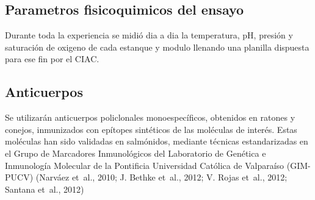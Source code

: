 \documentclass[12pt,letterpaper,oneside]{scrbook}
\begin{document}
\subsection{Parametros fisicoquimicos del ensayo}

Durante toda la experiencia se midió dia a dia la temperatura, pH,
presión y saturación de oxigeno de cada estanque y modulo llenando una
planilla dispuesta para ese fin por el CIAC.

\subsection{Anticuerpos}

Se utilizarán anticuerpos policlonales monoespecíficos, obtenidos en
ratones y conejos, inmunizados con epítopes sintéticos de las moléculas
de interés. Estas moléculas han sido validadas en salmónidos, mediante
técnicas estandarizadas en el Grupo de Marcadores Inmunológicos del
Laboratorio de Genética e Inmunología Molecular de la Pontificia
Universidad Católica de Valparaíso (GIM-PUCV) (Narváez et~al., 2010; J.
Bethke et~al., 2012; V. Rojas et~al., 2012; Santana et~al., 2012)
\end{document}
